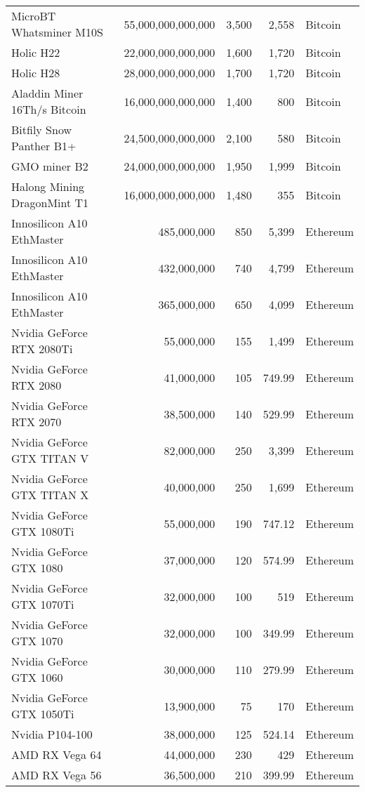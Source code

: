 \begin{longtable}{|p{}|r|r|r|p{}|}
  MicroBT Whatsminer M10S & 55,000,000,000,000 & 3,500 & 2,558 & Bitcoin \\
  Holic H22 & 22,000,000,000,000 & 1,600 & 1,720 & Bitcoin \\
  Holic H28 & 28,000,000,000,000 & 1,700 & 1,720 & Bitcoin \\
  Aladdin Miner 16Th/s Bitcoin & 16,000,000,000,000 & 1,400 & 800 & Bitcoin \\
  Bitfily Snow Panther B1+ & 24,500,000,000,000 & 2,100 & 580 & Bitcoin \\
  GMO miner B2 & 24,000,000,000,000 & 1,950 & 1,999 & Bitcoin \\
  Halong Mining DragonMint T1 & 16,000,000,000,000 & 1,480 & 355 & Bitcoin \\
  \hline
  Innosilicon A10 EthMaster & 485,000,000 & 850 & 5,399 & Ethereum \\
  Innosilicon A10 EthMaster & 432,000,000 & 740 & 4,799 & Ethereum \\
  Innosilicon A10 EthMaster & 365,000,000 & 650 & 4,099 & Ethereum \\
  Nvidia GeForce RTX 2080Ti & 55,000,000 & 155 & 1,499 & Ethereum \\
  Nvidia GeForce RTX 2080 & 41,000,000 & 105 & 749.99 & Ethereum \\
  Nvidia GeForce RTX 2070 & 38,500,000 & 140 & 529.99 & Ethereum \\
  Nvidia GeForce GTX TITAN V & 82,000,000 & 250 & 3,399 & Ethereum \\
  Nvidia GeForce GTX TITAN X & 40,000,000 & 250 & 1,699 & Ethereum \\
  Nvidia GeForce GTX 1080Ti & 55,000,000 & 190 & 747.12 & Ethereum \\
  Nvidia GeForce GTX 1080 & 37,000,000 & 120 & 574.99 & Ethereum \\
  Nvidia GeForce GTX 1070Ti & 32,000,000 & 100 & 519 & Ethereum \\
  Nvidia GeForce GTX 1070 & 32,000,000 & 100 & 349.99 & Ethereum \\
  Nvidia GeForce GTX 1060 & 30,000,000 & 110 & 279.99 & Ethereum \\
  Nvidia GeForce GTX 1050Ti & 13,900,000 & 75 & 170 & Ethereum \\
  Nvidia P104-100 & 38,000,000 & 125 & 524.14 & Ethereum \\
  AMD RX Vega 64 & 44,000,000 & 230 & 429 & Ethereum \\
  AMD RX Vega 56 & 36,500,000 & 210 & 399.99 & Ethereum \\

\end{longtable}
